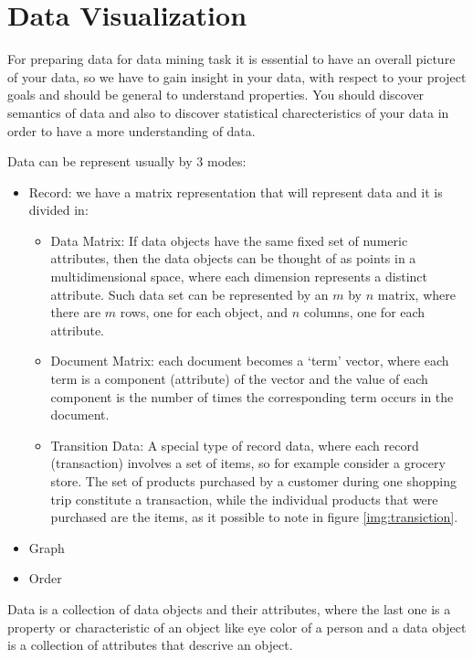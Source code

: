 \chapter{Data Visualization}
For preparing data for data mining task it is essential to have an overall picture of your data, so we have to
gain insight in your data, with respect to your project goals and should be general to understand properties.\newline
You should discover semantics of data and also to discover statistical charecteristics of your data in
order to have a more understanding of data.

Data can be represent usually by $3$ modes:
\begin{itemize}
    \item Record: we have a matrix representation that will represent data and it is divided in:
            \begin{itemize}
                \item Data Matrix: If data objects have the same fixed set of numeric attributes,
                      then the data objects can be thought of as points in a multidimensional space,
                      where each dimension represents a distinct attribute.\newline
                      Such data set can be represented by an $m$ by $n$ matrix, where there are $m$ rows,
                      one for each object, and $n$ columns, one for each attribute.

                \item Document Matrix: each document becomes a ‘term’ vector, where each term 
                      is a component (attribute) of the vector and the value of each component is 
                      the number of times the corresponding term occurs in the document.
                \item Transition Data: A special type of record data, where each record (transaction)
                      involves a set of items, so for example consider a grocery store.\newline
                      The set of products purchased by a customer during one shopping trip constitute a transaction,
                      while the individual products that were purchased are the items,
                      as it possible to note in figure \ref{img:transiction}.
            \end{itemize}
    \item Graph
    \item Order
\end{itemize}
Data is a collection of data objects and their attributes, where the last one is a property or 
characteristic of an object like eye color of a person and a data object is a collection of 
attributes that descrive an object.

